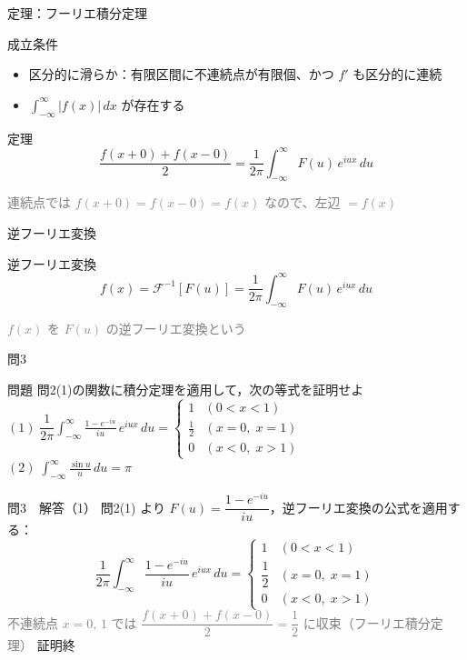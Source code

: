 \documentclass[professionalfonts]{beamer}
\begin{document}
\begin{frame}{定理：フーリエ積分定理}
  \begin{block}{成立条件}
  \begin{itemize}
    \item 区分的に滑らか：有限区間に不連続点が有限個、かつ $f'$ も区分的に連続
    \item $\displaystyle\int_{-\infty}^{\infty}|f(x)|\,dx$ が存在する
  \end{itemize}
  \end{block}
  \begin{block}{定理}
  \[
    \frac{f(x+0)+f(x-0)}{2} = \frac{1}{2\pi}\int_{-\infty}^{\infty} F(u)\,e^{iux}\,du
  \]
  \end{block}
  {\footnotesize\textcolor{gray}{連続点では $f(x+0)=f(x-0)=f(x)$ なので、左辺 $= f(x)$}}
\end{frame}

\begin{frame}{逆フーリエ変換}
  \begin{block}{逆フーリエ変換}
  \[
    f(x) = \mathcal{F}^{-1}[F(u)] = \frac{1}{2\pi}\int_{-\infty}^{\infty} F(u)\,e^{iux}\,du
  \]
  \end{block}
  {\footnotesize\textcolor{gray}{$f(x)$ を $F(u)$ の逆フーリエ変換という}}
\end{frame}

\begin{frame}{問3　}
  \begin{exampleblock}{問題}
    問2(1)の関数に積分定理を適用して，次の等式を証明せよ\\[4pt]
    $(1)\;\dfrac{1}{2\pi}\displaystyle\int_{-\infty}^{\infty}\frac{1-e^{-iu}}{iu}\,e^{iux}\,du
      = \begin{cases} 1 & (0<x<1) \\ \tfrac{1}{2} & (x=0,\;x=1) \\ 0 & (x<0,\;x>1) \end{cases}$\\[8pt]
    $(2)\;\displaystyle\int_{-\infty}^{\infty}\frac{\sin u}{u}\,du = \pi$
  \end{exampleblock}
\end{frame}

\begin{frame}{問3　解答（1）}
  問2(1) より $F(u)=\dfrac{1-e^{-iu}}{iu}$，逆フーリエ変換の公式を適用する：\\[6pt]
  \[
    \frac{1}{2\pi}\int_{-\infty}^{\infty}\frac{1-e^{-iu}}{iu}\,e^{iux}\,du
    = \begin{cases} 1 & (0<x<1) \\[4pt] \dfrac{1}{2} & (x=0,\;x=1) \\[4pt] 0 & (x<0,\;x>1) \end{cases}
  \]
  {\footnotesize\textcolor{gray}{不連続点 $x=0,\,1$ では $\dfrac{f(x+0)+f(x-0)}{2}=\dfrac{1}{2}$ に収束（フーリエ積分定理）}}
  \vfill\hfill 証明終
\end{frame}
\end{document}
